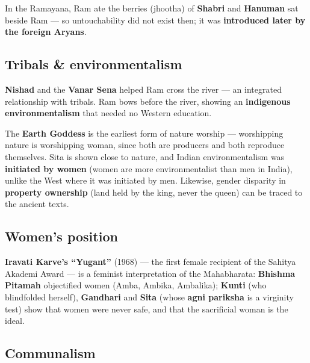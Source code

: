 \begin{ExampleBox}
In the Ramayana, Ram ate the berries (jhootha) of \textbf{Shabri} and \textbf{Hanuman} sat beside Ram --- so untouchability did not exist then; it was \textbf{introduced later by the foreign Aryans}.
\end{ExampleBox}

\subsection{Tribals \& environmentalism}

\begin{ExampleBox}
\textbf{Nishad} and the \textbf{Vanar Sena} helped Ram cross the river --- an integrated relationship with tribals. Ram bows before the river, showing an \textbf{indigenous environmentalism} that needed no Western education.
\end{ExampleBox}

\begin{ExampleBox}
The \textbf{Earth Goddess} is the earliest form of nature worship --- worshipping nature is worshipping woman, since both are producers and both reproduce themselves. Sita is shown close to nature, and Indian environmentalism was \textbf{initiated by women} (women are more environmentalist than men in India), unlike the West where it was initiated by men. Likewise, gender disparity in \textbf{property ownership} (land held by the king, never the queen) can be traced to the ancient texts.
\end{ExampleBox}

\subsection{Women's position}

\begin{ExampleBox}
\textbf{Iravati Karve's ``Yugant''} (1968) --- the first female recipient of the Sahitya Akademi Award --- is a feminist interpretation of the Mahabharata: \textbf{Bhishma Pitamah} objectified women (Amba, Ambika, Ambalika); \textbf{Kunti} (who blindfolded herself), \textbf{Gandhari} and \textbf{Sita} (whose \textbf{agni pariksha} is a virginity test) show that women were never safe, and that the sacrificial woman is the ideal.
\end{ExampleBox}

\subsection{Communalism}

